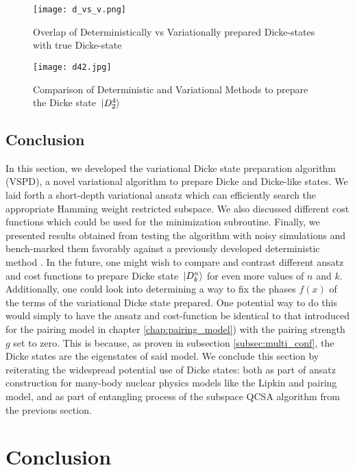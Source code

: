 \documentclass[10pt]{article}
\begin{document}
\begin{figure}
    \centering
    \texttt{[image: d\_vs\_v.png]}
    \caption{Overlap of Deterministically vs Variationally prepared Dicke-states with true Dicke-state}
    \label{fig:dicke_overlap}
\end{figure}

\begin{figure}
    \centering
    \texttt{[image: d42.jpg]}
    \caption{Comparison of Deterministic and Variational Methods to prepare the Dicke state $\ket*{D^4_2}$}
    \label{fig:dicke_comp}
\end{figure}

\section{Conclusion}

In this section, we developed the variational Dicke state preparation algorithm (VSPD), a novel variational algorithm to prepare Dicke and Dicke-like states. We laid forth a short-depth variational ansatz which can efficiently search the appropriate Hamming weight restricted subspace. We also discussed different cost functions which could be used for the minimization subroutine. Finally, we presented results obtained from testing the algorithm with noisy simulations and bench-marked them favorably against a previously developed deterministic method \cite{dick_prep}. In the future, one might wish to compare and contrast different ansatz and cost functions to prepare Dicke state $\ket*{D^n_k}$ for even more values of $n$ and $k$. Additionally, one could look into determining a way to fix the phases $f(x)$ of the terms of the variational Dicke state prepared. One potential way to do this would simply to have the ansatz and cost-function be identical to that introduced for the pairing model in chapter \ref{chap:pairing_model}) with the pairing strength $g$ set to zero. This is because, as proven in subsection \ref{subsec:multi_conf}, the Dicke states are the eigenstates of said model. We conclude this section by reiterating the widespread potential use of Dicke states: both as part of ansatz construction for many-body nuclear physics models like the Lipkin and pairing model, and as part of entangling process of the subspace QCSA algorithm from the previous section.

\chapter{Conclusion}
\end{document}
